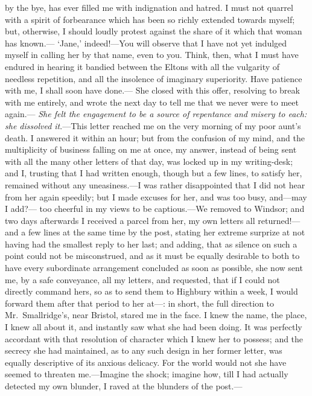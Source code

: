 by the bye, has ever filled me with indignation and hatred.
I must not quarrel with a spirit of forbearance which has been
so richly extended towards myself; but, otherwise, I should loudly
protest against the share of it which that woman has known.---%
`Jane,' indeed!---You will observe that I have not yet indulged myself
in calling her by that name, even to you.  Think, then, what I must
have endured in hearing it bandied between the Eltons with all
the vulgarity of needless repetition, and all the insolence of
imaginary superiority.  Have patience with me, I shall soon have done.---%
She closed with this offer, resolving to break with me entirely,
and wrote the next day to tell me that we never were to meet again.---%
\emph{She felt the engagement to be a source of repentance and misery
to each:  she dissolved it}.---This letter reached me on the very
morning of my poor aunt's death.  I answered it within an hour;
but from the confusion of my mind, and the multiplicity of business
falling on me at once, my answer, instead of being sent with all
the many other letters of that day, was locked up in my writing-desk;
and I, trusting that I had written enough, though but a few lines,
to satisfy her, remained without any uneasiness.---I was rather
disappointed that I did not hear from her again speedily;
but I made excuses for her, and was too busy, and---may I add?---%
too cheerful in my views to be captious.---We removed to Windsor;
and two days afterwards I received a parcel from her, my own letters
all returned!---and a few lines at the same time by the post,
stating her extreme surprize at not having had the smallest reply
to her last; and adding, that as silence on such a point could
not be misconstrued, and as it must be equally desirable to both
to have every subordinate arrangement concluded as soon as possible,
she now sent me, by a safe conveyance, all my letters, and requested,
that if I could not directly command hers, so as to send them
to Highbury within a week, I would forward them after that period
to her at---:  in short, the full direction to Mr.\ Smallridge's,
near Bristol, stared me in the face.  I knew the name, the place,
I knew all about it, and instantly saw what she had been doing.
It was perfectly accordant with that resolution of character
which I knew her to possess; and the secrecy she had maintained,
as to any such design in her former letter, was equally descriptive
of its anxious delicacy.  For the world would not she have seemed
to threaten me.---Imagine the shock; imagine how, till I had actually
detected my own blunder, I raved at the blunders of the post.---%
